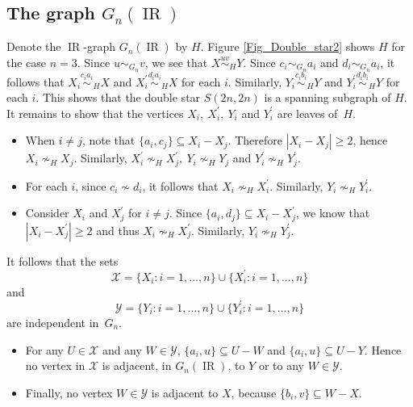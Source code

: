 \documentclass[12pt]{article}%
\begin{document}
\subsection{The graph $G_{n}(\operatorname{IR})$}

Denote the $\operatorname{IR}$-graph $G_{n}(\operatorname{IR})$ by $H$. Figure
\ref{Fig_Double_star2} shows $H$ for the case $n=3$. Since $u\sim_{G_{n}}v$,
we see that $X\overset{uv}{\sim}_{H}Y$. Since $c_{i}\sim_{G_{n}}a_{i}$ and
$d_{i}\sim_{G_{n}}a_{i}$, it follows that $X_{i}\overset{c_{i}a_{i}}{\sim}%
_{H}X$ and $X_{i}^{\prime}\overset{d_{i}a_{i}}{\sim}_{H}X$ for each $i$.
Similarly, $Y_{i}\overset{c_{i}b_{i}}{\sim}_{H}Y$ and $Y_{i}^{\prime
}\overset{d_{i}b_{i}}{\sim}_{H}Y$ for each $i$. This shows that the double
star $S(2n,2n)$ is a spanning subgraph of $H$. It remains to show that the
vertices $X_{i},\ X_{i}^{\prime},\ Y_{i}$ and $Y_{i}^{\prime}$ are leaves
of~$H$.

\begin{itemize}
\item When $i\neq j$, note that $\{a_{i},c_{j}\}\subseteq X_{i}-X_{j}$.
Therefore $|X_{i}-X_{j}|\geq2$, hence $X_{i}\nsim_{H}X_{j}$. Similarly,
$X_{i}^{\prime}\nsim_{H}X_{j}^{\prime},\ Y_{i}\nsim_{H}Y_{j}$ and
$Y_{i}^{\prime}\nsim_{H}Y_{j}^{\prime}$.

\item For each $i$, since $c_{i}\nsim d_{i}$, it follows that $X_{i}\nsim
_{H}X_{i}^{\prime}$. Similarly, $Y_{i}\nsim_{H}Y_{i}^{\prime}$.

\item Consider $X_{i}$ and $X_{j}^{\prime}$ for $i\neq j$. Since
$\{a_{i},d_{j}\}\subseteq X_{i}-X_{j}^{\prime}$, we know that $|X_{i}%
-X_{j}^{\prime}|\geq2$ and thus $X_{i}\nsim_{H}X_{j}^{\prime}$. Similarly,
$Y_{i}\nsim_{H}Y_{j}^{\prime}$.
\end{itemize}

It follows that the sets
\[
\mathcal{X}=\{X_{i}:i=1,...,n\}\cup\{X_{i}^{\prime}:i=1,...,n\}
\]
and%
\[
\mathcal{Y}=\{Y_{i}:i=1,...,n\}\cup\{Y_{i}^{\prime}:i=1,...,n\}
\]
are independent in~$G_{n}$.

\begin{itemize}
\item For any $U\in\mathcal{X}$ and any $W\in\mathcal{Y}$, $\{a_{i}%
,u\}\subseteq U-W$ and $\{a_{i},u\}\subseteq U-Y$. Hence no vertex in
$\mathcal{X}$ is adjacent, in $G_{n}(\operatorname{IR})$, to $Y$ or to any
$W\in\mathcal{Y}$.

\item Finally, no vertex $W\in\mathcal{Y}$ is adjacent to $X$, because
$\{b_{i},v\}\subseteq W-X$.
\end{itemize}
\end{document}

